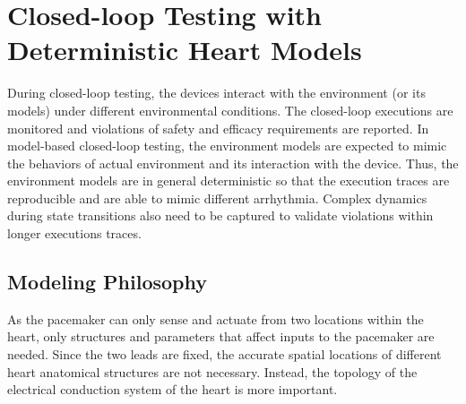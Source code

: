 

\section{Closed-loop Testing with Deterministic Heart Models}
During closed-loop testing, the devices interact with the environment (or its models) under different environmental conditions. The closed-loop executions are monitored and violations of safety and efficacy requirements are reported. In model-based closed-loop testing, the environment models are expected to mimic the behaviors of actual environment and its interaction with the device. Thus, the environment models are in general deterministic so that the execution traces are reproducible and are able to mimic different arrhythmia. Complex dynamics during state transitions also need to be captured to validate violations within longer executions traces. 

\subsection{Modeling Philosophy}
As the pacemaker can only sense and actuate from two locations within the heart, only structures and parameters that affect inputs to the pacemaker are needed. Since the two leads are fixed, the accurate spatial locations of different heart anatomical structures are not necessary. Instead, the topology of the electrical conduction system of the heart is more important. 


